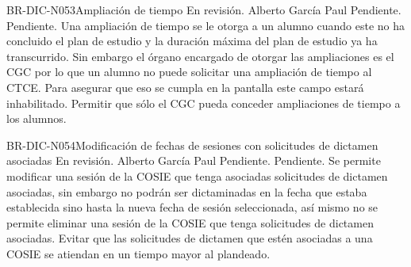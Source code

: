 \begin{BusinessRule}{BR-DIC-N053}{Ampliación de tiempo}
	{\bcCondition} %
	{\btEnabler}     %
	{\blInfluencing}     %
	\BRItem[Estado] En revisión.
	 Alberto García Paul
	 Pendiente.
	 Pendiente.
	\BRItem[Descripción] Una ampliación de tiempo se le otorga a un alumno cuando este no ha concluido el plan de estudio y la duración máxima del plan de estudio ya ha transcurrido. Sin embargo el órgano encargado de otorgar las ampliaciones es el CGC por lo que un alumno no puede solicitar una ampliación de tiempo al CTCE. Para asegurar que eso se cumpla en la pantalla  este campo estará inhabilitado.
%	
	\BRItem[Motivación] Permitir que sólo el CGC pueda conceder ampliaciones de tiempo a los alumnos.

\end{BusinessRule}
\begin{BusinessRule}{BR-DIC-N054}{Modificación de fechas de sesiones con solicitudes de dictamen asociadas}
	{\bcCondition} %
	{\btEnabler}     %
	{\blInfluencing}     %
	\BRItem[Estado] En revisión.
	 Alberto García Paul
	 Pendiente.
	 Pendiente.
	\BRItem[Descripción]  Se permite modificar una sesión de la COSIE que tenga asociadas solicitudes de dictamen asociadas, sin embargo no podrán ser dictaminadas en la fecha que estaba establecida sino hasta la nueva fecha de sesión seleccionada, así mismo no se permite eliminar una sesión de la COSIE que tenga solicitudes de dictamen asociadas.
	\BRItem[Motivación] Evitar que las solicitudes de dictamen que estén asociadas a una COSIE se atiendan en un tiempo mayor al plandeado.
\end{BusinessRule}
